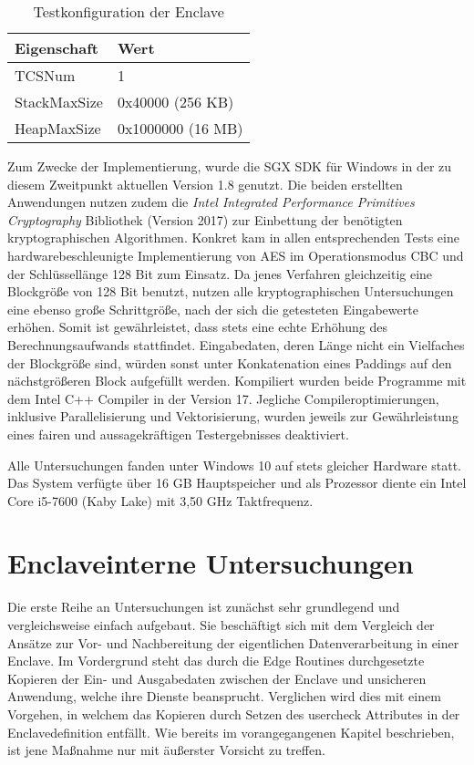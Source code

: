 \begin{table}[h]
	\centering
	\caption{Testkonfiguration der Enclave}
	\begin{tabular}{|l|l|}
		\hline
		\textbf{Eigenschaft} & \textbf{Wert} \\
		\hline
		TCSNum & 1 \\
		\hline
		StackMaxSize & 0x40000 (256 KB) \\
		\hline
		HeapMaxSize & 0x1000000 (16 MB) \\
		\hline
	\end{tabular}
	\label{tab:sgxtestconfig}
\end{table}

Zum Zwecke der Implementierung, wurde die \ac{SGX} \ac{SDK} für Windows in der zu diesem Zweitpunkt aktuellen Version 1.8 genutzt. Die beiden erstellten Anwendungen nutzen zudem die \textit{Intel Integrated Performance Primitives Cryptography} Bibliothek (Version 2017) zur Einbettung der benötigten kryptographischen Algorithmen. Konkret kam in allen entsprechenden Tests eine hardwarebeschleunigte Implementierung von \ac{AES} im Operationsmodus \ac{CBC} und der Schlüssellänge 128 Bit zum Einsatz. Da jenes Verfahren gleichzeitig eine Blockgröße von 128 Bit benutzt, nutzen alle kryptographischen Untersuchungen eine ebenso große Schrittgröße, nach der sich die getesteten Eingabewerte erhöhen. Somit ist gewährleistet, dass stets eine echte Erhöhung des Berechnungsaufwands stattfindet. Eingabedaten, deren Länge nicht ein Vielfaches der Blockgröße sind, würden sonst unter Konkatenation eines Paddings auf den nächstgrößeren Block aufgefüllt werden. Kompiliert wurden beide Programme mit dem Intel C++ Compiler in der Version 17. Jegliche Compileroptimierungen, inklusive Parallelisierung und Vektorisierung, wurden jeweils zur Gewährleistung eines fairen und aussagekräftigen Testergebnisses deaktiviert.

Alle Untersuchungen fanden unter Windows 10 auf stets gleicher Hardware statt. Das System verfügte über 16 GB Hauptspeicher und als Prozessor diente ein Intel Core i5-7600 (Kaby Lake) mit 3,50 GHz Taktfrequenz.

\section{Enclaveinterne Untersuchungen}

Die erste Reihe an Untersuchungen ist zunächst sehr grundlegend und vergleichsweise einfach aufgebaut. Sie beschäftigt sich mit dem Vergleich der Ansätze zur Vor- und Nachbereitung der eigentlichen Datenverarbeitung in einer Enclave. Im Vordergrund steht das durch die Edge Routines durchgesetzte Kopieren der Ein- und Ausgabedaten zwischen der Enclave und unsicheren Anwendung, welche ihre Dienste beansprucht. Verglichen wird dies mit einem Vorgehen, in welchem das Kopieren durch Setzen des user\textunderscore check Attributes in der Enclavedefinition entfällt. Wie bereits im vorangegangenen Kapitel beschrieben, ist jene Maßnahme nur mit äußerster Vorsicht zu treffen.

